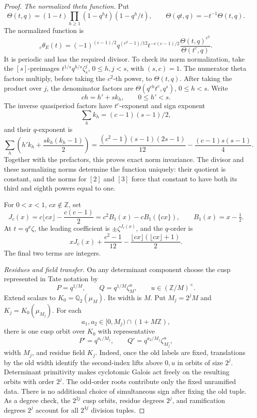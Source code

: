 \begin{proof}
\emph{The normalized theta function.}
Put
\[
 \Theta(t,q)=(1-t)\prod_{h\geq1}(1-q^ht)(1-q^h/t),
 \qquad \Theta(qt,q)=-t^{-1}\Theta(t,q).
\]
The normalized function is
\[
 {}_c\theta_E(t)=(-1)^{(c-1)/2}q^{(c^2-1)/12}
 t^{-c(c-1)/2}\frac{\Theta(t,q)^{c^2}}{\Theta(t^c,q)}.
\]
It is periodic and has the required divisor.  To check its norm
normalization, take the \([s]\)-preimages
\(t^{1/s}q^{h/s}\zeta_s^j\), \(0\leq h,j<s\), with \((s,c)=1\).
The numerator theta factors multiply, before taking the \(c^2\)-th
power, to \(\Theta(t,q)\).  After taking the product over \(j\),
the denominator factors are
\(\Theta(q^{ch}t^c,q^s)\), \(0\leq h<s\).  Write
\[
                    ch=h'+sk_h,\qquad 0\leq h'<s.
\]
The inverse quasiperiod factors have \(t^c\)-exponent and sign exponent
\[
                         \sum_h k_h=(c-1)(s-1)/2,
\]
and their \(q\)-exponent is
\[
 \sum_h\left(h'k_h+\frac{s k_h(k_h-1)}2\right)
 =\frac{(c^2-1)(s-1)(2s-1)}{12}
     -\frac{(c-1)s(s-1)}4.
\]
Together with the prefactors, this proves exact norm invariance.
The divisor and these normalizing norms determine the function
uniquely: their quotient is constant, and the norms for \([2]\) and
\([3]\) force that constant to have both its third and eighth powers
equal to one.

For \(0<x<1\), \(cx\notin\mathbb Z\), set
\[
 J_c(x)=c\lfloor cx\rfloor-\frac{c(c-1)}2
       =c^2B_1(x)-cB_1(\{cx\}),
 \qquad B_1(x)=x-\tfrac12.
\]
At \(t=q^x\zeta\), the leading coefficient is
\(\pm\zeta^{J_c(x)}\), and the \(q\)-order is
\[
 xJ_c(x)+\frac{c^2-1}{12}
            -\frac{\lfloor cx\rfloor(\lfloor cx\rfloor+1)}2.
\]
The final two terms are integers.

\emph{Residues and field transfer.}
On any determinant component choose the cusp represented in Tate
notation by
\[
                     P=q^{1/M},\qquad
                     Q=q^{1/M}\zeta_M^u,
                     \qquad u\in(\mathbb Z/M)^\times.
\]
Extend scalars to \(K_0=\mathbb Q_2(\mu_M)\).  Its width is \(M\).
Put \(M_j=2^jM\) and \(K_j=K_0(\mu_{M_j})\).  For each
\[
                a_1,a_2\in[0,M_j)\cap(1+M\mathbb Z),
\]
there is one cusp orbit over \(K_0\) with representative
\[
             P'=q^{a_1/M_j},\qquad
             Q'=q^{a_2/M_j}\zeta_{M_j}^u,
\]
width \(M_j\), and residue field \(K_j\).  Indeed, once the old labels
are fixed, translations by the old width identify the second-index
lifts above \(0,u\) in orbits of size \(2^j\).  Determinant primitivity
makes cyclotomic Galois act freely on the resulting orbits with order
\(2^j\).  The odd-order roots contribute only the fixed unramified data.
There is no additional choice of simultaneous sign after fixing the
old tuple.  As a degree check, the \(2^{2j}\) cusp orbits, residue degrees
\(2^j\), and ramification degrees \(2^j\) account for all \(2^{4j}\)
division tuples.


\end{proof}
